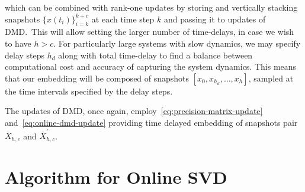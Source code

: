 which can be combined with rank-one updates by storing and vertically stacking snapshots \({\{x(t_i)\}}^{k+c}_{i=k}\) at each time step \(k\) and passing it to updates of DMD.~This will allow setting the larger number of time-delays, in case we wish to have \(h > c\). For particularly large systems with slow dynamics, we may specify delay steps \(h_d\) along with total time-delay to find a balance between computational cost and accuracy of capturing the system dynamics. This means that our embedding will be composed of snapshots \( [x_0, x_{h_d}, \ldots, x_h] \), sampled at the time intervals specified by the delay steps.

The updates of DMD, once again, employ~\eqref{eq:precision-matrix-update} and~\eqref{eq:online-dmd-update} providing time delayed embedding of snapshots pair \(\bar{X}_{h, c}\) and \(\bar{X}^\prime_{h, c}\).


\section{Algorithm for Online SVD}

